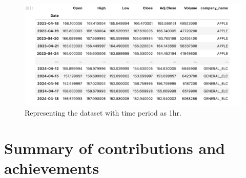 \begin{figure}[ht]
    \centering
    \includegraphics[scale=0.3]{figures/Dataset.png}
    \caption{Representing the dataset with time period as 1hr.}
    \label{fig:chart_a}
\end{figure}





\section{Summary of contributions and achievements} %
\label{sec:intro_sum_results} %




